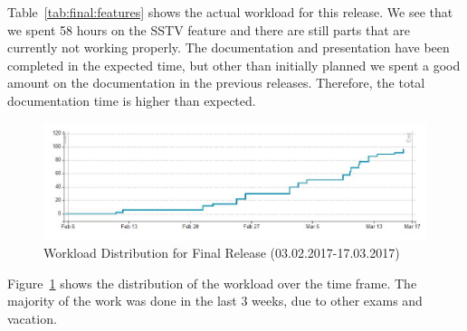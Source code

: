 Table~\ref{tab:final:features} shows the actual workload for this release. We see that we spent 58 hours on the SSTV feature and there are still parts that are currently not working properly. The documentation and presentation have been completed in the expected time, but other than initially planned we spent a good amount on the documentation in the previous releases. Therefore, the total documentation time is higher than expected. 

\begin{figure}[!htbp]
	\centering
	\includegraphics[width=1\linewidth]{gfx/Agilefant_Final.jpg}
	\caption{Workload Distribution for Final Release (03.02.2017-17.03.2017)}
	\label{fig:agilefant_final}
\end{figure}

Figure~\ref{fig:agilefant_final} shows the distribution of the workload over the time frame. The majority of the work was done in the last 3 weeks, due to other exams and vacation. 

